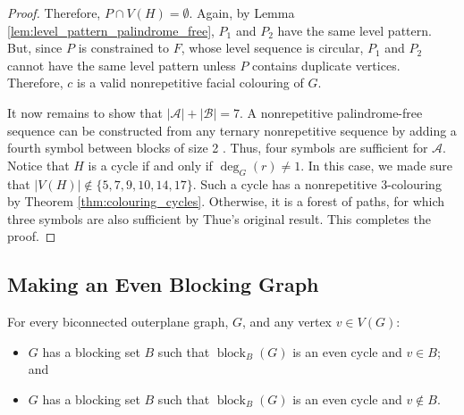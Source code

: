 \documentclass{patmorin}
\DeclareMathOperator{\block}{block}
\begin{document}
\begin{proof}
 Therefore, $P \cap V(H) = \emptyset$. Again, by Lemma \ref{lem:level_pattern_palindrome_free}, $P_1$ and $P_2$ have the same level pattern. But, since $P$ is constrained to $F$, whose level sequence is circular, $P_1$ and $P_2$ cannot have the same level pattern unless $P$ contains duplicate vertices. Therefore, $c$ is a valid nonrepetitive facial colouring of $G$.
 
 It now remains to show that $|\mathcal{A}|+|\mathcal{B}|=7$. A nonrepetitive palindrome-free sequence can be constructed from any ternary nonrepetitive sequence by adding a fourth symbol between blocks of size 2 \cite{brevsar2007nonrepetitive}. Thus, four symbols are sufficient for $\mathcal{A}$. Notice that $H$ is a cycle if and only if $\deg_G(r)\not=1$. In this case, we made sure that $|V(H)| \notin \{5,7,9,10,14,17\}$. Such a cycle has a nonrepetitive 3-colouring by Theorem \ref{thm:colouring_cycles}. Otherwise, it is a forest of paths, for which three symbols are also sufficient by Thue's original result. This completes the proof. 	
\end{proof}




\subsection{Making an Even Blocking Graph}

\begin{lem}
  For every biconnected outerplane graph, $G$, and any vertex $v\in V(G)$:
  \begin{itemize}
    \item $G$ has a blocking set $B$ such that $\block_B(G)$ is an even cycle 
       and $v\in B$; and
    \item $G$ has a blocking set $B$ such that $\block_B(G)$ is an even cycle 
       and $v\not\in B$.
  \end{itemize}
\end{lem}
\end{document}
